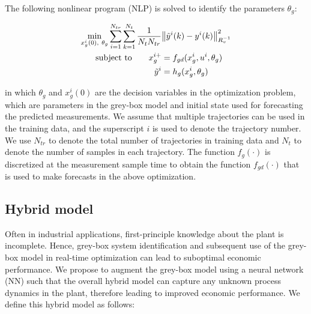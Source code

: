 \documentclass[10pt]{article}
\begin{document}
The following nonlinear program (NLP) is solved to identify the parameters $\theta_g$:

\begin{align} \label{eq:gb_training}
  \underset{x_g^i(0), \ \theta_g}{\textnormal{min}} \sum_{i=1}^{N_{tr}} \sum_{k=1}^{N_t} 
  \dfrac{1}{N_tN_{tr}} &\norm{\tilde{y}^i(k) - y^i(k)}^2_{R_v^{-1}}  \\
  \textnormal{subject to} \quad \quad x_g^{i+} &= f_{gd}(x_g^i, u^i, \theta_g) \nonumber \\
   \tilde{y}^i &= h_g(x_g^i, \theta_g) \nonumber
\end{align}

in which $\theta_g$ and $x_g^i(0)$ are the decision variables in the optimization problem, which are parameters in the grey-box model and initial state used for forecasting the predicted measurements. We assume that multiple trajectories can be used in the training data, and the superscript $i$ is used to denote the trajectory number. We use $N_{tr}$ to denote the total number of trajectories in training data and $N_t$ to denote the number of samples in each trajectory. The function $f_{g}(\cdot)$ is discretized at the measurement sample time to obtain the function $f_{gd}(\cdot)$ that is used to make forecasts in the above optimization.

\subsection{Hybrid model}

Often in industrial applications, first-principle knowledge about the plant is incomplete. Hence, grey-box system identification and subsequent use of the grey-box model in real-time optimization can lead to suboptimal economic performance. We propose to augment the grey-box model using a neural network (NN) such that the overall hybrid model can capture any unknown process dynamics in the plant, therefore leading to improved economic performance. We define this hybrid model as follows:
\end{document}
